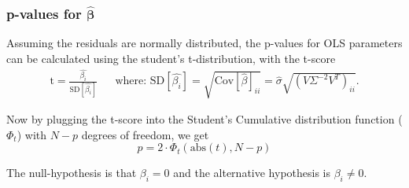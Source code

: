 \subsubsection{p-values for $\hat{\boldsymbol\beta}$}

Assuming the residuals are normally distributed, the p-values for OLS parameters can be calculated using the student's t-distribution, with the t-score \cite[p.~172]{time-series-analysis}
\begin{align}
\mathrm{t} = \frac{\hat{\beta_i}}{\mathrm{SD}[\hat{\beta_i}]} && \text{where: } \mathrm{SD}[\hat{\beta_i}] = \sqrt{\mathrm{Cov}[\hat{\beta}]_{ii}} = \hat{\sigma} \sqrt{ (V \Sigma^{-2} V^T)_{ii} }.
\end{align}

Now by plugging the t-score into the Student's Cumulative distribution function ($\Phi_t$) with $N - p$ degrees of freedom, we get
\begin{equation}
p = 2 \cdot \Phi_t\left(\mathrm{abs}(t), N-p\right)
\end{equation}

The null-hypothesis is that $\beta_i = 0$ and the alternative hypothesis is $\beta_i \not = 0$.
